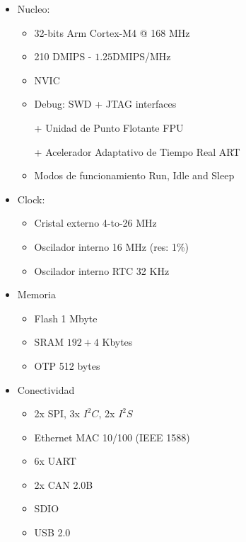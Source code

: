 \documentclass[10pt, a4paper]{article}
\begin{document}
\begin{itemize}                                                                  
    \item Nucleo: 

        \begin{itemize}                                                                  
            \item  32-bits Arm Cortex-M4 @ 168 MHz     
            \item  210 \acrshort{DMIPS} - $1.25$\acrshort{DMIPS}/MHz
            \item \acrfull{NVIC}
            \item Debug: \acrfull{SWD} + JTAG interfaces
            \item [+] Unidad de Punto Flotante \acrshort{FPU} 
            \item [+] Acelerador Adaptativo de Tiempo Real \acrshort{ART} 
            \item Modos de funcionamiento Run, Idle and Sleep                          
        \end{itemize}

    \item Clock:

        \begin{itemize}
            \item Cristal externo 4-to-26 MHz 
            \item Oscilador interno 16 MHz (res: 1\%)
            \item Oscilador interno RTC 32 KHz 
        \end{itemize}

    \item Memoria                                       

        \begin{itemize}                                                                  
            \item Flash 1 Mbyte 
            \item \acrshort{SRAM} $192+4$ Kbytes  
            \item \acrshort{OTP} 512 bytes 
        \end{itemize}

    \item Conectividad

        \begin{itemize}                                                                  
            \item 2x SPI, 3x $I^2C$, 2x $I^2S$
            \item Ethernet MAC 10/100 (IEEE 1588)
            \item 6x UART 
            \item 2x CAN 2.0B 
            \item SDIO 
            \item USB 2.0 
        \end{itemize}


\end{itemize}
\end{document}
